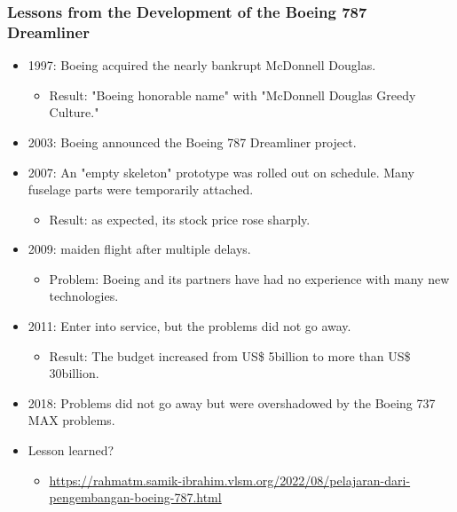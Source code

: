 \documentclass[aspectratio=169, xcolor=table, notheorems, hyperref={pdfpagelabels=false}]{beamer}
\begin{document}
\begin{frame}[fragile]
\frametitle{Lessons from the Development of the Boeing 787 Dreamliner}
\begin{itemize}
\item 1997: Boeing acquired the nearly bankrupt  McDonnell Douglas.
\begin{itemize}
\item Result: "Boeing honorable name" with "McDonnell Douglas Greedy Culture."
\end{itemize}
\item 2003: Boeing announced the Boeing 787 Dreamliner project.
\item 2007: An "empty skeleton" prototype was rolled out on schedule. Many fuselage parts were temporarily attached.
\begin{itemize}
\item Result: as expected, its stock price rose sharply.
\end{itemize}
\item 2009: maiden flight after multiple delays.
\begin{itemize}
\item Problem: Boeing and its partners have had no experience with many new technologies.
\end{itemize}
\item 2011: Enter into service, but the problems did not go away.
\begin{itemize}
\item Result: The budget increased from US\$ 5billion to more than US\$ 30billion.
\end{itemize}
\item 2018: Problems did not go away but were overshadowed by the Boeing 737 MAX problems.
\item Lesson learned?
\begin{itemize}
\item{\scriptsize \url{https://rahmatm.samik-ibrahim.vlsm.org/2022/08/pelajaran-dari-pengembangan-boeing-787.html}}
\end{itemize}
\end{itemize}
\end{frame}

\end{document}
